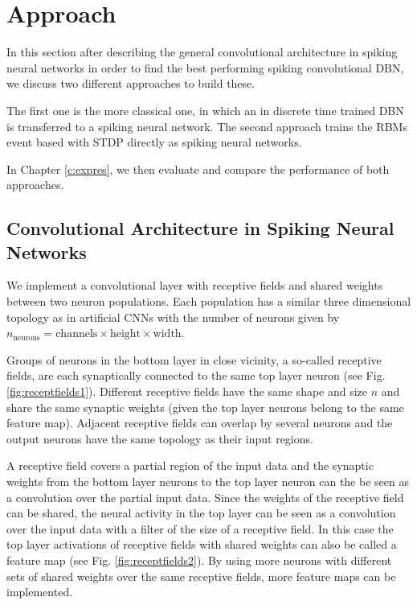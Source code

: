 \chapter{Approach} \label{c:approach}

In this section after describing the general convolutional architecture in spiking neural networks in order to find the best performing spiking convolutional DBN, we discuss two different approaches to build these.

The first one is the more classical one, in which an in discrete time trained DBN is transferred to a spiking neural network.
The second approach trains the RBMs event based with STDP directly as spiking neural networks. 

In Chapter \ref{c:expres}, we then evaluate and compare the performance of both approaches.

\section{Convolutional Architecture in Spiking Neural Networks} \label{c:spikingconvarch}

We implement a convolutional layer with receptive fields and shared weights between two neuron populations. 
Each population has a similar three dimensional topology as in artificial CNNs with the number of neurons given by $n_{ \text{neurons}} = \text{channels} \times \text{height} \times \text{width}$.

Groups of neurons in the bottom layer in close vicinity, a so-called receptive fields, are each synaptically connected to the same top layer neuron (see Fig. \ref{fig:receptfields1}).
Different receptive fields have the same shape and size $n$ and share the same synaptic weights (given the top layer neurons belong to the same feature map).
Adjacent receptive fields can overlap by several neurons and the output neurons have the same topology as their input regions. 

A receptive field covers a partial region of the input data and the synaptic weights from the bottom layer neurons to the top layer neuron can the be seen as a convolution over the partial input data.
Since the weights of the receptive field can be shared, the neural activity in the top layer can be seen as a convolution over the input data with a filter of the size of a receptive field.
In this case the top layer activations of receptive fields with shared weights can also be called a feature map  (see Fig. \ref{fig:receptfields2}).
By using more neurons with different sets of shared weights over the same receptive fields, more feature maps can be implemented.     

